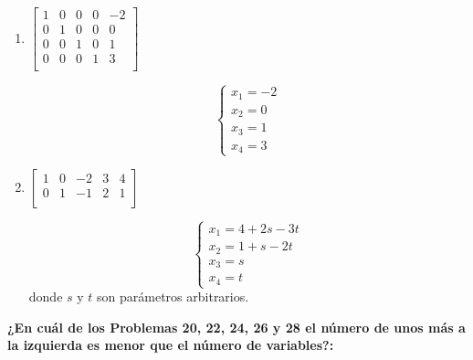 \documentclass[answers]{exam} %
\begin{document}
\begin{questions}
	\begin{enumerate}[label=\alph*.]
		\item $\displaystyle
			      \left[
				      \begin{array}{cccc|c}
					      {1} & {0} & {0} & {0} & -2 \\
					      {0} & {1} & {0} & {0} & 0  \\
					      {0} & {0} & {1} & {0} & 1  \\
					      {0} & {0} & {0} & {1} & 3  \\
				      \end{array}
				      \right]
		      $
		      \vspace{0.5cm}
		      \begin{solution}
			      \[
				      \left\{
				      \begin{array}{l}
					      x_1 = -2 \\
					      x_2 = 0  \\
					      x_3 = 1  \\
					      x_4 = 3
				      \end{array}
				      \right.
			      \]
		      \end{solution}


		\item $\displaystyle
			      \left[
				      \begin{array}{cccc|c}
					      {1} & {0} & {-2} & {3} & 4 \\
					      {0} & {1} & {-1} & {2} & 1 \\
				      \end{array}
				      \right]
		      $
		      \vspace{0.5cm}
		      \begin{solution}
			      \[
				      \left\{
				      \begin{array}{l}
					      x_1 = 4 + 2s - 3t \\
					      x_2 = 1 + s - 2t  \\
					      x_3 = s           \\
					      x_4 = t
				      \end{array}
				      \right.
			      \]
			      donde \( s \) y \( t \) son parámetros arbitrarios.
		      \end{solution}

	\end{enumerate}

	\vspace{0.5cm}
	\question \large\textbf{¿En cuál de los Problemas 20, 22, 24, 26 y 28 el número de unos más a la izquierda es menor que el número de variables?:}



\end{questions}
\end{document}
